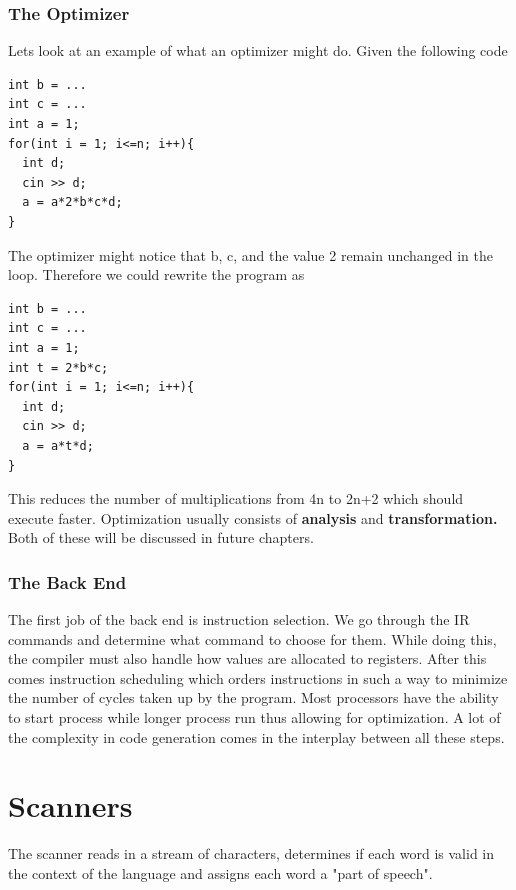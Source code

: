 \documentclass{article}
\begin{document}
\subsubsection{The Optimizer}
Lets look at an example of what an optimizer might do. Given the following code
\begin{lstlisting}
int b = ...
int c = ...
int a = 1;
for(int i = 1; i<=n; i++){
  int d;
  cin >> d;
  a = a*2*b*c*d;
}
\end{lstlisting}
The optimizer might notice that b, c, and the value 2 remain unchanged in the loop. Therefore we could rewrite the program as
\begin{lstlisting}
int b = ...
int c = ...
int a = 1;
int t = 2*b*c;
for(int i = 1; i<=n; i++){
  int d;
  cin >> d;
  a = a*t*d;
}
\end{lstlisting}
This reduces the number of multiplications from 4n to 2n+2 which should execute faster. Optimization usually consists of \textbf{analysis} and \textbf{transformation.} Both of these will be discussed in future chapters.
\subsubsection{The Back End}
The first job of the back end is instruction selection. We go through the IR commands and determine what command to choose for them. While doing this, the compiler must also handle how values are allocated to registers. After this comes instruction scheduling which orders instructions in such a way to minimize the number of cycles taken up by the program. Most processors have the ability to start process while longer process run thus allowing for optimization. A lot of the complexity in code generation comes in the interplay between all these steps.
\section{Scanners}
The scanner reads in a stream of characters, determines if each word is valid in the context of the language and assigns each word a "part of speech". 
\end{document}
